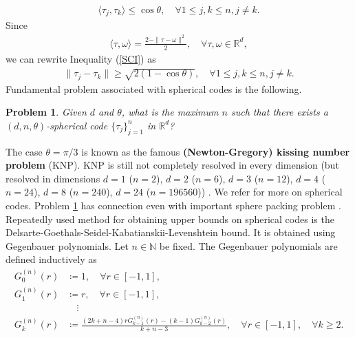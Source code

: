 \documentclass{amsart}
\newtheorem{problem}[theorem]{Problem}
\begin{document}
 	\begin{align}\label{SCI}
 	\langle \tau_j, \tau_k\rangle\leq \cos \theta , \quad \forall 1\leq j, k \leq n, j \neq k.
 \end{align}
Since 
\begin{align*}
	\langle \tau, \omega\rangle =\frac{2-\|\tau-\omega\|^2}{2}, \quad \forall \tau, \omega \in \mathbb{R}^d, 
\end{align*}
we can rewrite Inequality (\ref{SCI}) as 
\begin{align*}\label{SCN}
	\|\tau_j-\tau_k\|\geq  \sqrt{2(1-\cos \theta)}, \quad \forall 1\leq j, k \leq n, j \neq k.	
\end{align*}	
 Fundamental problem associated with spherical codes is the following.
 \begin{problem}\label{SCP}
 	Given $d$ and $\theta$, what is the maximum $n$ such that there exists a $(d,n,\theta )$-spherical code $\{\tau_j\}_{j=1}^n$  in $\mathbb{R}^d$?
 \end{problem}
 The case $\theta=\pi/3$ is known as the famous \textbf{(Newton-Gregory) kissing number problem} (KNP). KNP  is still not completely resolved in every dimension (but resolved in dimensions $d=1$ ($n=2$), $d=2$ ($n=6$), $d=3$ ($n=12$), $d=4$ ($n=24$), $d=8$ ($n=240$), $d=24$ ($n=196560$)) \cite{ANSTREICHER, PFENDER, CASSELMAN, MUSIN1, MUSIN2, ODLYZKOSLOANE,  SCHUTTEVANDERWAERDEN,  PFENDERZIEGLER, BACHOCVELLENTIN, MITTELMANNVALLENTIN, BOYVALENKOVDODUNEKOVMUSIN, BOROCZKY, MAEHARA, GLAZYRIN, LIBERTI, LEECH, KALLALKANWANG, JENSSENJOOSPERKINS, MACHADOFILHO, KUKLIN}. We refer  \cite{DELSARTEGOETHALSSEIDEL, BOYVALENKOVDRAGNEVHARDINSTOYANOVA, BARGMUSIN, BOYVALENKOVDRAGNEVHARDINSTOYANOVA2, ERICSONZINOVIEV, SARDARIZARGAR, MUSIN3, BANNAISLOANE, BACHOCVALLENTIN2, CONWAYSLOANE, COHNJIAOKUMARTORQUATO, SAMORODNITSKY, BOYVALENKOVDANEV, BOYVALENKOVDANEVLANDGEV, SLOANE, BANNAIBANNAI, BOROCZKYGLAZYRIN}
  for more on spherical codes. Problem \ref{SCP} has connection even with important sphere packing  problem \cite{COHNZHAO}. Repeatedly  used method for obtaining upper bounds on spherical codes is the Delsarte-Goethals-Seidel-Kabatianskii-Levenshtein
bound. It is obtained using Gegenbauer polynomials. Let $n \in \mathbb{N}$ be fixed. The Gegenbauer polynomials are defined inductively as 
\begin{align*}
	G_0^{(n)}(r)&\coloneqq1,\quad \forall r \in [-1,1],\\
	G_1^{(n)}(r)&\coloneqq r,\quad \forall r \in [-1,1],\\
	&\quad\vdots\\
	G_k^{(n)}(r)&\coloneqq\frac{(2k+n-4)rG_{k-1}^{(n)}(r)-(k-1)	G_{k-2}^{(n)}(r)}{k+n-3}, \quad \forall r \in [-1,1], \quad \forall k \geq 2.
\end{align*}
\end{document}
